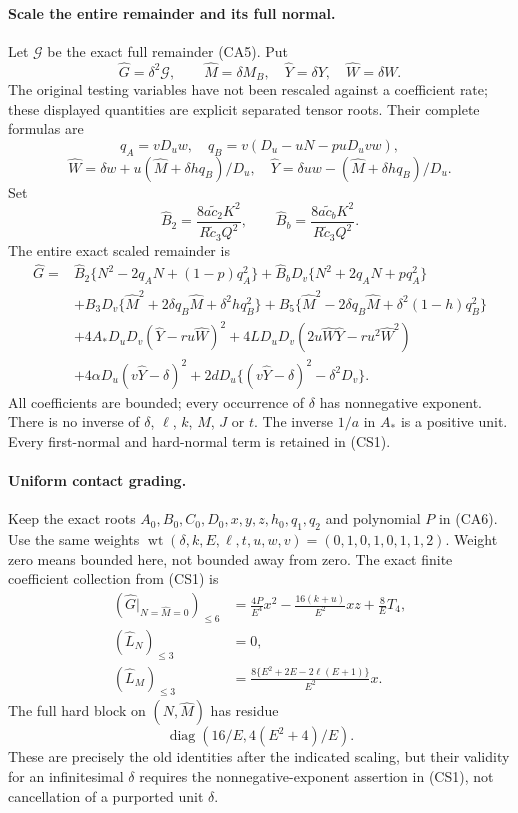 \paragraph{Scale the entire remainder and its full normal.}
Let $\mathscr G$ be the exact full remainder (CA5). Put
\[
 \widehat G=\delta^2\mathscr G,\qquad
 \widehat M=\delta M_B,\quad \widehat Y=\delta Y,
 \quad\widehat W=\delta W.
\]
The original testing variables have not been rescaled against a
coefficient rate; these displayed quantities are explicit separated
tensor roots. Their complete formulas are
\[
 q_A=vD_uw,\quad q_B=v(D_u-uN-puD_uv w),
\]
\[
 \widehat W=\delta w+u(\widehat M+\delta hq_B)/D_u,
 \quad\widehat Y=\delta uw-(\widehat M+\delta hq_B)/D_u.
\]
Set
\[
 \widehat B_2=\frac{8a\widetilde c_2K^2}{R\widetilde c_3Q^2},
 \qquad
 \widehat B_b=\frac{8a\widetilde c_bK^2}{R\widetilde c_3Q^2}.
\]
The entire exact scaled remainder is
\begin{align*}
\widehat G={}&\widehat B_2\{N^2-2q_AN+(1-p)q_A^2\}
 +\widehat B_bD_v\{N^2+2q_AN+pq_A^2\}\\
&+B_3D_v\{\widehat M^2+2\delta q_B\widehat M+\delta^2hq_B^2\}
 +B_5\{\widehat M^2-2\delta q_B\widehat M+\delta^2(1-h)q_B^2\}\\
&+4A_*D_uD_v(\widehat Y-r u\widehat W)^2
 +4LD_uD_v(2u\widehat W\widehat Y-r u^2\widehat W^2)\\
&+4\alpha D_u(v\widehat Y-\delta)^2
 +2dD_u\{(v\widehat Y-\delta)^2-\delta^2D_v\}.
 \tag{CS1}
\end{align*}
All coefficients are bounded; every occurrence of $\delta$ has
nonnegative exponent. There is no inverse of $\delta$, $\ell$, $k$,
$M$, $J$ or $t$. The inverse $1/a$ in $A_*$ is a positive unit.
Every first-normal and hard-normal term is retained in (CS1).

\paragraph{Uniform contact grading.}
Keep the exact roots $A_0,B_0,C_0,D_0,x,y,z,h_0,q_1,q_2$ and polynomial
$P$ in (CA6). Use the same weights
$\operatorname{wt}(\delta,k,E,\ell,t,u,w,v)=(0,1,0,1,0,1,1,2)$.
Weight zero means bounded here, not bounded away from zero.
The exact finite coefficient collection from (CS1) is
\[
 \begin{aligned}
 (\widehat G|_{N=\widehat M=0})_{\le6}
 &=\frac{4P}{E^4}x^2-\frac{16(k+u)}{E^2}xz+\frac8E T_4,\\
 (\widehat L_N)_{\le3}&=0,\\
 (\widehat L_M)_{\le3}
 &=\frac{8\{E^2+2E-2\ell(E+1)\}}{E^2}x.
 \end{aligned}                                                    \tag{CS2}
\]
The full hard block on $(N,\widehat M)$ has residue
\[
        \operatorname{diag}(16/E,4(E^2+4)/E).          \tag{CS3}
\]
These are precisely the old identities after the indicated scaling,
but their validity for an infinitesimal $\delta$ requires the
nonnegative-exponent assertion in (CS1), not cancellation of a
purported unit $\delta$.

